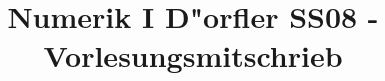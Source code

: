 \documentclass{scrartcl}
\begin{document}
\newenvironment{aaufz}
               {\renewcommand{\labelenumi}{\alph{enumi})}
                \renewcommand{\labelenumii}{\alph{enumii})}
                \begin{enumerate}}
               {\end{enumerate}}

\newenvironment{iaufz}
               {\renewcommand{\labelenumi}{(\roman{enumi})}
                \renewcommand{\labelenumii}{(\roman{enumii})}
                \begin{enumerate}}
               {\end{enumerate}}
\newenvironment{1aufz}
               {\renewcommand{\labelenumi}{\arabic{enumi}.)}
                \renewcommand{\labelenumii}{\arabic{enumii}.)}
                \begin{enumerate}}
               {\end{enumerate}}

\newcommand{\RR}{\mathbb{R}}
\newcommand{\CC}{\mathbb{C}}
\newcommand{\NN}{\mathbb{N}}
\newcommand{\FF}{\mathbb{F}}
\newcommand{\PP}{\mathbb{P}}
\newcommand{\ZZ}{\mathbb{Z}}
\newcommand{\LL}{\mathbb{L}}
\newcommand{\rd}{\mathrm{rd}}
\newcommand{\Vvert}{\vert \hspace{-0.7pt} \vert \hspace{-0.7pt} \vert}
\newcommand{\supp}{\mathrm{supp} \,}
\newcommand{\gradient}{\mathrm{grad} \, }
\newcommand{\divergenz}{\mathrm{div} \, }
\newcommand{\tridiag}{\mathrm{tridiag}}
\newcommand{\diag}{\mathrm{diag}}
\newcommand{\cond}{\mathrm{cond}}
\newcommand{\Bild}{\mathrm{Bild}}
\newcommand{\Rang}{\mathrm{Rang}}
\newcommand{\spann}{\mathrm{span}}
\newcommand{\spec}{\mathrm{spec}}
\newcommand{\compl}{\mathrm{compl}}
\newcommand{\Tol}{\mathrm{Tol}}
\renewcommand{\d}{\, \mathrm{d}}
\renewcommand{\O}{\mathcal{O}}
\newcommand{\subsubsub}[1]{\paragraph*{#1} \ }

\newtheorem{Lemma}{Lemma}
\newtheorem{Thm}{Theorem}
\newtheorem{Satz}{Satz}
\newtheorem*{Beweis}{Beweis}
\newtheorem*{Def}{Definition}


\newenvironment{Bew}{\begin{Beweis}}{\qed \end{Beweis}}

\title{Numerik I D"orfler SS08 - Vorlesungsmitschrieb}
\author{}
\date{}
\maketitle
\end{document}
